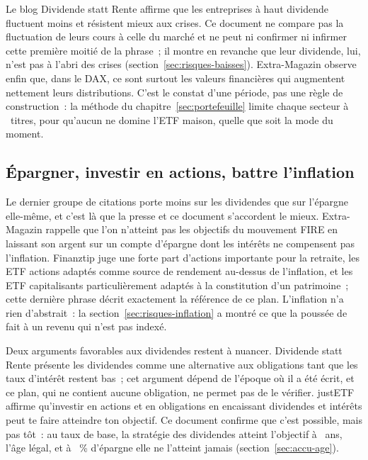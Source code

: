Le blog Dividende statt Rente affirme que les entreprises \`a haut dividende fluctuent moins et
r\'esistent mieux aux crises. Ce document ne compare pas la fluctuation de
leurs cours \`a celle du march\'e et ne peut ni confirmer ni infirmer cette premi\`ere moiti\'e de la
phrase~; il montre en revanche que leur dividende, lui, n'est pas \`a l'abri des crises
(section~\ref{sec:risques-baisses}). Extra-Magazin observe enfin que, dans le DAX, ce sont surtout les
valeurs financi\`eres qui augmentent nettement leurs distributions. C'est
le constat d'une p\'eriode, pas une r\`egle de construction~: la m\'ethode du
chapitre~\ref{sec:portefeuille} limite chaque secteur \`a \RegleSecteurMax~titres, pour qu'aucun ne
domine l'ETF maison, quelle que soit la mode du moment.

\subsection{\'Epargner, investir en actions, battre l'inflation}\label{sec:presse-epargne}

Le dernier groupe de citations porte moins sur les dividendes que sur l'\'epargne elle-m\^eme, et c'est
l\`a que la presse et ce document s'accordent le mieux. Extra-Magazin rappelle que l'on n'atteint pas
les objectifs du mouvement FIRE en laissant son argent sur un compte d'\'epargne dont les int\'er\^ets
ne compensent pas l'inflation. Finanztip juge une forte part d'actions importante
pour la retraite, les ETF actions adapt\'es comme source de rendement au-dessus de l'inflation, et
les ETF capitalisants particuli\`erement adapt\'es \`a la constitution d'un
patrimoine~; cette derni\`ere phrase d\'ecrit exactement la r\'ef\'erence de
ce plan. L'inflation n'a rien d'abstrait~: la section~\ref{sec:risques-inflation} a montr\'e ce que
la pouss\'ee de \InflationPicAnnee{} fait \`a un revenu qui n'est pas index\'e.

Deux arguments favorables aux dividendes restent \`a nuancer. Dividende statt Rente pr\'esente les
dividendes comme une alternative aux obligations tant que les taux d'int\'er\^et restent bas~; cet
argument d\'epend de l'\'epoque o\`u il a \'et\'e \'ecrit, et ce plan, qui ne contient aucune obligation,
ne permet pas de le v\'erifier. justETF affirme qu'investir en actions et en obligations en encaissant
dividendes et int\'er\^ets peut te faire atteindre ton objectif. Ce document confirme que c'est
possible, mais pas t\^ot~: au taux de base, la strat\'egie des dividendes atteint l'objectif \`a
\AlterYannBasis~ans, l'\^age l\'egal, et \`a \SparquoteZwanzig~\% d'\'epargne elle ne l'atteint jamais
(section~\ref{sec:accu-age}). 

